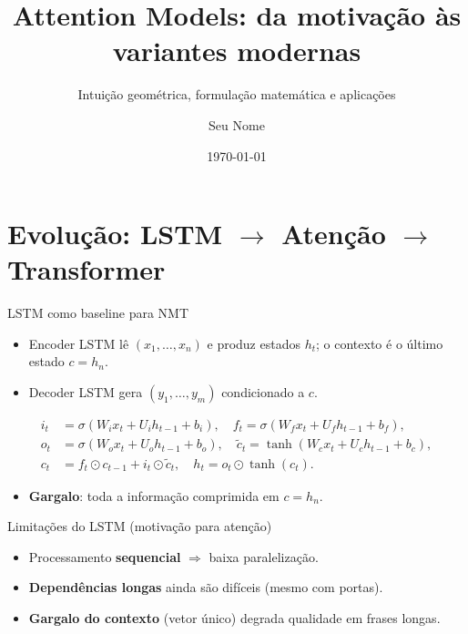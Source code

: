 \documentclass{beamer}
\title{Attention Models: da motivação às variantes modernas}
\subtitle{Intuição geométrica, formulação matemática e aplicações}
\author{Seu Nome}
\date{\today}
\begin{document}
\maketitle


\section{Evolução: LSTM \texorpdfstring{$\rightarrow$}{->} Atenção \texorpdfstring{$\rightarrow$}{->} Transformer}

\begin{frame}{LSTM como baseline para NMT}
\begin{itemize}
  \item Encoder LSTM lê $(x_1,\dots,x_n)$ e produz estados $h_t$; o contexto é o último estado $c=h_n$.
  \item Decoder LSTM gera $(y_1,\dots,y_m)$ condicionado a $c$.
\end{itemize}
\[
\begin{aligned}
 i_t &= \sigma(W_i x_t + U_i h_{t-1} + b_i),\quad
 f_t = \sigma(W_f x_t + U_f h_{t-1} + b_f),\\
 o_t &= \sigma(W_o x_t + U_o h_{t-1} + b_o),\quad
 \tilde{c}_t = \tanh(W_c x_t + U_c h_{t-1} + b_c),\\
 c_t &= f_t \odot c_{t-1} + i_t \odot \tilde{c}_t,\quad
 h_t = o_t \odot \tanh(c_t).
\end{aligned}
\]
\begin{itemize}
  \item \textbf{Gargalo}: toda a informação comprimida em $c=h_n$.
\end{itemize}
\end{frame}

\begin{frame}{Limitações do LSTM (motivação para atenção)}
\begin{itemize}
  \item Processamento \textbf{sequencial} $\Rightarrow$ baixa paralelização.
  \item \textbf{Dependências longas} ainda são difíceis (mesmo com portas).
  \item \textbf{Gargalo do contexto} (vetor único) degrada qualidade em frases longas.
\end{itemize}
\end{frame}
\end{document}

